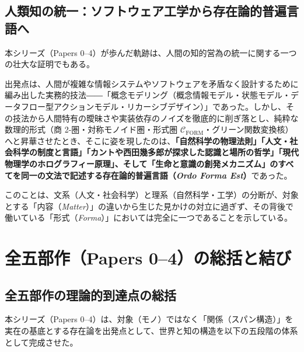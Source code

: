 \documentclass[11pt,a4paper]{ltjsarticle}
\theoremstyle{definition}
\theoremstyle{plain}
\begin{document}
\subsection{人類知の統一：ソフトウェア工学から存在論的普遍言語へ}
本シリーズ（Papers 0--4）が歩んだ軌跡は、人間の知的営為の統一に関する一つの壮大な証明でもある。

出発点は、人間が複雑な情報システムやソフトウェアを矛盾なく設計するために編み出した実務的技法――「概念モデリング（概念情報モデル・状態モデル・データフロー型アクションモデル・リカーシブデザイン）」であった。しかし、その技法から人間特有の曖昧さや実装依存のノイズを徹底的に削ぎ落とし、純粋な数理的形式（商 2-圏・対称モノイド圏・形式圏 $\mathcal{C}_{\mathrm{FORM}}$・グリーン関数変換核）へと昇華させたとき、そこに姿を現したのは、\textbf{「自然科学の物理法則」「人文・社会科学の制度と言語」「カントや西田幾多郎が探求した認識と場所の哲学」「現代物理学のホログラフィー原理」、そして「生命と意識の創発メカニズム」のすべてを同一の文法で記述する存在論的普遍言語（\textit{Ordo Forma Est}）}であった。

このことは、文系（人文・社会科学）と理系（自然科学・工学）の分断が、対象とする「内容（\textit{Matter}）」の違いから生じた見かけの対立に過ぎず、その背後で働いている「形式（\textit{Forma}）」においては完全に一つであることを示している。

\section{全五部作（Papers 0--4）の総括と結び}

\subsection{全五部作の理論的到達点の総括}
本シリーズ（Papers 0--4）は、対象（モノ）ではなく「関係（スパン構造）」を実在の基底とする存在論を出発点として、世界と知の構造を以下の五段階の体系として完成させた。
\end{document}
